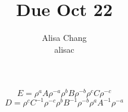 \documentclass[11pt]{article} %
\title{ \\ Due Oct 22}
\author{Alisa Chang \\ alisac}
\date{} %
\begin{document}
$$E = \rho^a A \rho^{-a} \rho^b B \rho^{-b} \rho^c C \rho^{-c}$$
$$D = \rho^c C^{-1} \rho^{-c} \rho^b B^{-1} \rho^{-b} \rho^a A^{-1} \rho^{-a}$$
\end{document}
